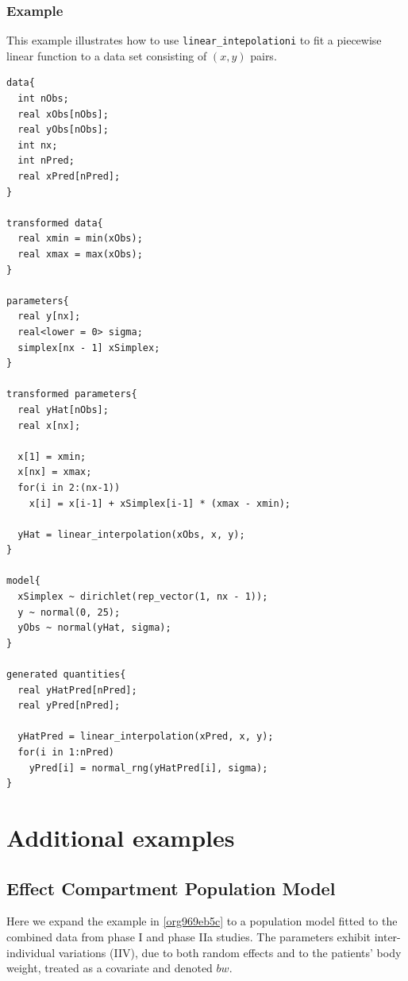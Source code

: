 \documentclass[11pt, reqno, oneside]{amsbook}
\numberwithin{equation}{chapter}
\numberwithin{figure}{chapter}
\numberwithin{table}{chapter}
\theoremstyle{remark}
\begin{document}
\subsection{Example}
\label{sec:org1fc9ba5}
This example illustrates how to use \texttt{linear\_intepolationi}
to fit a piecewise linear function to a data set consisting
of \((x, y)\) pairs.
\begin{verbatim}
data{
  int nObs;
  real xObs[nObs];
  real yObs[nObs];
  int nx;
  int nPred;
  real xPred[nPred];
}

transformed data{
  real xmin = min(xObs);
  real xmax = max(xObs);
}

parameters{
  real y[nx];
  real<lower = 0> sigma;
  simplex[nx - 1] xSimplex;
}

transformed parameters{
  real yHat[nObs];
  real x[nx];

  x[1] = xmin;
  x[nx] = xmax;
  for(i in 2:(nx-1))
    x[i] = x[i-1] + xSimplex[i-1] * (xmax - xmin);

  yHat = linear_interpolation(xObs, x, y);
}

model{
  xSimplex ~ dirichlet(rep_vector(1, nx - 1));
  y ~ normal(0, 25);
  yObs ~ normal(yHat, sigma);
}

generated quantities{
  real yHatPred[nPred];
  real yPred[nPred];

  yHatPred = linear_interpolation(xPred, x, y);
  for(i in 1:nPred)
    yPred[i] = normal_rng(yHatPred[i], sigma);
}
\end{verbatim}

\chapter{Additional examples}
\label{sec:orgf3e0b07}
\section{Effect Compartment Population Model}
\label{sec:orgb90f695}
Here we expand the example in \ref{org969eb5c} to a population model fitted to the
combined data from phase I and phase IIa studies. The
parameters exhibit inter-individual variations (IIV), due to
both random effects and to the patients' body weight,
treated as a covariate and denoted \(bw\).
\end{document}

